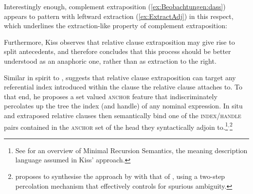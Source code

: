 \documentclass[output=paper
,notxmath 
 	        ,biblatex
                ,babelshorthands
                ,newtxmath
                ,draftmode
                ,colorlinks, citecolor=brown
]{langscibook}
\begin{document}
Interestingly enough, complement extraposition (\ref{ex:Beobachtungen:dass}) appears to pattern with
leftward extraction (\ref{ex:ExtractAdj}) in this respect, which underlines the
extraction-like property of complement extraposition:

\z

Furthermore, Kiss observes that relative clause extraposition may give
rise to split antecedents, and therefore concludes that this process
should be better understood as an anaphoric one, rather than as
extraction to the right. 

Similar in spirit to \citet{culicover90:_extrap_and_compl_princ},
\citet{kiss_t02nllt} suggests that relative clause extraposition can
target any referential index introduced within the clause the relative {clause}
attaches to.  To that end, he proposes a set valued \textsc{anchor}
feature that indiscriminately percolates up the tree the index (and
handle) of any nominal expression. In situ and extraposed relative
clauses then semantically bind one of the \textsc{index/handle} pairs
contained in the \textsc{anchor} set of the head they syntactically
adjoin to.\footnote{See
  for an overview of Minimal Recursion Semantics, the meaning
  description language assumed in Kiss'
  approach.}$^,$\footnote{\citet{crysmann_b04rlc} proposes to
  synthesise the approach by \citet{kiss_t02nllt} with that of
  \citet{Keller:95}, using a two-step percolation mechanism that
  effectively controls for spurious ambiguity.}
\end{document}
